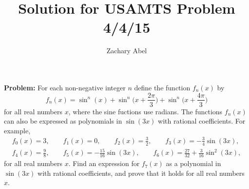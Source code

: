 \documentclass[11pt]{article}
\title{Solution for USAMTS Problem 4/4/15}
\author{Zachary Abel}
\begin{document}
\maketitle
%
%
\noindent\textbf{\large{Problem:}} For each non-negative integer $n$ define the function $f_n(x)$ by
\[
f_n(x)=\sin^n(x)+\sin^n\big(x+\frac{2\pi}{3}\big)+\sin^n\big(x+\frac{4\pi}{3}\big)
\]
for all real numbers $x$, where the sine fuctions use radians. The functions $f_n(x)$ can also be expressed as polynomials in $\sin(3x)$ with rational coefficients. For example,
\begin{gather*}
f_0(x)=3,\qquad f_1(x)=0,\qquad f_2(x)=\frac{3}{2},\qquad f_3(x)=-\frac{3}{4}\sin(3x),\\
f_4(x)=\frac{9}{8},\qquad f_5(x)=-\frac{15}{16}\sin(3x),\qquad f_6(x)=\frac{27}{32}+\frac{3}{16}\sin^2(3x),
\end{gather*}
for all real numbers $x$. Find an expression for $f_7(x)$ as a polynomial in $\sin(3x)$ with rational coefficients, and prove that it holds for all real numbers $x$.
\newline
\end{document}
